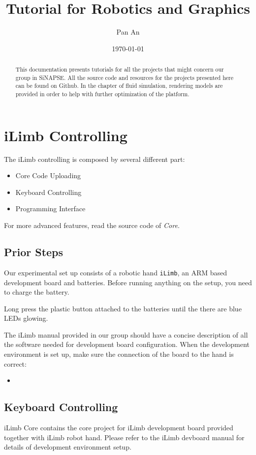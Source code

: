 \documentclass[11pt]{article}
\author{Pan An}
\date{\today}
\title{Tutorial for Robotics and Graphics}
\begin{document}
\maketitle
\setcounter{tocdepth}{2}
\tableofcontents

\newpage
\begin{abstract}
This documentation presents tutorials for all the projects that might concern our group in SiNAPSE. All the source code and resources for the projects presented here can be found on Github. In the chapter of fluid simulation, rendering models are provided in order to help with further optimization of the platform.
\end{abstract}

\newpage
\section{iLimb Controlling}
\label{sec:orgheadline5}
The iLimb controlling is composed by several different part:
\begin{itemize}
\item Core Code Uploading
\item Keyboard Controlling
\item Programming Interface
\end{itemize}

For more advanced features, read the source code of \emph{Core}. 

\subsection{Prior Steps}
\label{sec:orgheadline1}
Our experimental set up consists of a robotic hand \texttt{iLimb}, an ARM based development board and batteries. Before running anything on the setup, you need to charge the battery.

Long press the plastic button attached to the batteries until the there are blue LEDs glowing.  

The iLimb manual provided in our group should have a concise description of all the software needed for development board configuration. When the development environment is set up, make sure the connection of the board to the hand is correct:

\begin{itemize}
\item 
\end{itemize}

\subsection{Keyboard Controlling}
\label{sec:orgheadline3}
iLimb Core contains the core project for iLimb development board provided together with iLimb robot hand. Please refer to the iLimb devboard manual for details of development environment setup. 
\end{document}
